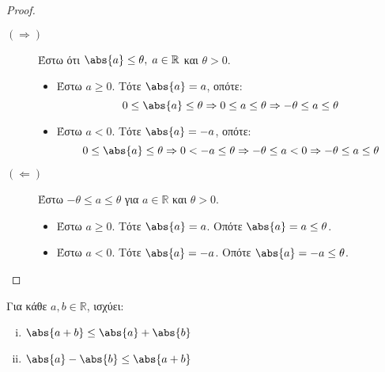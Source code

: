 \documentclass[main.tex]{subfiles}
\begin{document}
\begin{proof}
\item {}
    \begin{description}
        \item [$(  \Rightarrow ) $] 
            Έστω ότι $ \abs{a} \leq \theta, \; a \in \mathbb{R} $ και 
            $ \theta >0 $. 
            \begin{itemize}
                \item Έστω $ a \geq 0 $. Τότε $ \abs{a} = a $, οπότε:
                    \[
                        0 \leq \abs{a} \leq \theta \Rightarrow 
                        0 \leq a \leq \theta \Rightarrow - \theta 
                        \leq a \leq \theta
                    \] 
                \item Έστω $ a < 0 $. Τότε $ \abs{a} = -a $, οπότε:
                    \[
                        0 \leq \abs{a} \leq \theta \Rightarrow 
                        0 < -a \leq \theta \Rightarrow 
                        - \theta \leq a < 0 \Rightarrow 
                        - \theta \leq a \leq \theta 
                    \] 
            \end{itemize}
        \item [$(\Leftarrow)$] Έστω $ - \theta \leq a \leq \theta $ 
            για $ a \in \mathbb{R} $ και $ \theta >0 $.
            \begin{itemize}
                \item Έστω $ a \geq 0 $. Τότε $ \abs{a} = a $. Οπότε 
                    $ \abs{a} = a \leq \theta $.
                \item Έστω $ a <0 $. Τότε $ \abs{a} = -a $. Οπότε
                    $ \abs{a} = -a \leq \theta $.
            \end{itemize}
    \end{description}
\end{proof}

\begin{prop}
    Για κάθε $ a, b \in \mathbb{R} $, ισχύει:
    \begin{enumerate}[i)]
        \item $ \abs{a+b} \leq \abs{a} + \abs{b}   $
        \item $ \abs{a} - \abs{b} \leq \abs{a+b}  $
    \end{enumerate}
\end{prop}
\end{document}
